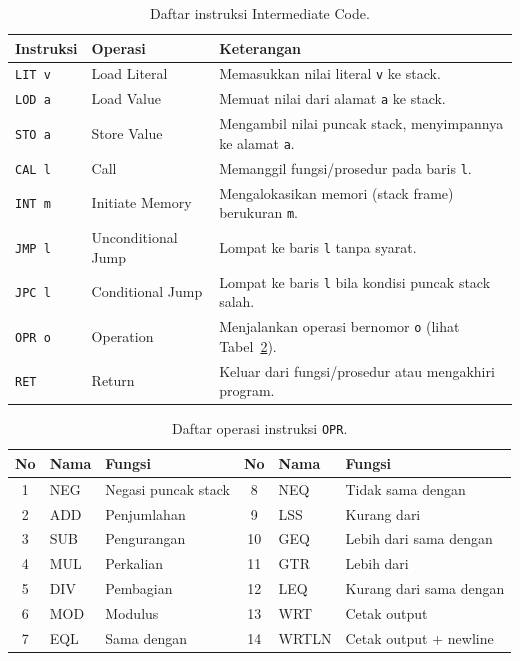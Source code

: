 \begin{table}[H]
\centering
\caption{Daftar instruksi Intermediate Code.}
\label{tab:instr}
\renewcommand{\arraystretch}{1.15}
\begin{tabularx}{\textwidth}{@{}l l X@{}}
\toprule
\textbf{Instruksi} & \textbf{Operasi} & \textbf{Keterangan} \\
\midrule
\texttt{LIT v} & Load Literal     & Memasukkan nilai literal \texttt{v} ke stack. \\
\texttt{LOD a} & Load Value       & Memuat nilai dari alamat \texttt{a} ke stack. \\
\texttt{STO a} & Store Value      & Mengambil nilai puncak stack, menyimpannya ke alamat \texttt{a}. \\
\texttt{CAL l} & Call             & Memanggil fungsi/prosedur pada baris \texttt{l}. \\
\texttt{INT m} & Initiate Memory  & Mengalokasikan memori (stack frame) berukuran \texttt{m}. \\
\texttt{JMP l} & Unconditional Jump & Lompat ke baris \texttt{l} tanpa syarat. \\
\texttt{JPC l} & Conditional Jump & Lompat ke baris \texttt{l} bila kondisi puncak stack salah. \\
\texttt{OPR o} & Operation        & Menjalankan operasi bernomor \texttt{o} (lihat Tabel~\ref{tab:opr}). \\
\texttt{RET}   & Return           & Keluar dari fungsi/prosedur atau mengakhiri program. \\
\bottomrule
\end{tabularx}
\end{table}

\begin{table}[H]
\centering
\caption{Daftar operasi instruksi \texttt{OPR}.}
\label{tab:opr}
\renewcommand{\arraystretch}{1.1}
\small
\begin{tabularx}{\textwidth}{@{}c l X | c l X@{}}
\toprule
\textbf{No} & \textbf{Nama} & \textbf{Fungsi} & \textbf{No} & \textbf{Nama} & \textbf{Fungsi} \\
\midrule
1 & NEG & Negasi puncak stack          & 8  & NEQ   & Tidak sama dengan \\
2 & ADD & Penjumlahan                  & 9  & LSS   & Kurang dari \\
3 & SUB & Pengurangan                  & 10 & GEQ   & Lebih dari sama dengan \\
4 & MUL & Perkalian                    & 11 & GTR   & Lebih dari \\
5 & DIV & Pembagian                    & 12 & LEQ   & Kurang dari sama dengan \\
6 & MOD & Modulus                      & 13 & WRT   & Cetak output \\
7 & EQL & Sama dengan                  & 14 & WRTLN & Cetak output + newline \\
\bottomrule
\end{tabularx}
\end{table}

